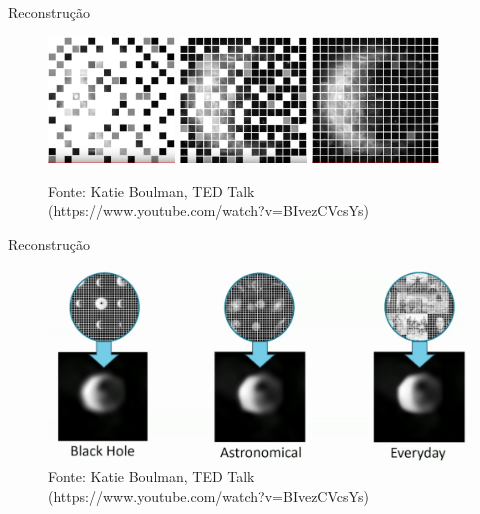 \documentclass{beamer}
\begin{document}
\begin{frame}{Reconstru\c{c}\~ao}
    \begin{figure}
        \includegraphics[width=0.3\textwidth]{figs/reconstrucao2.png}\hfill{}
        \includegraphics[width=0.3\textwidth]{figs/reconstrucao3.png}\hfill{}
        \includegraphics[width=0.3\textwidth]{figs/reconstrucao4.png}
        \caption{Fonte: Katie Boulman, TED
        Talk (https://www.youtube.com/watch?v=BIvezCVcsYs)}
    \end{figure}
\end{frame}

\begin{frame}{Reconstru\c{c}\~ao}
    \begin{figure}
        \includegraphics[width=\textwidth]{figs/reconstrucao5.png}\hfill{}
        \caption{Fonte: Katie Boulman, TED
        Talk (https://www.youtube.com/watch?v=BIvezCVcsYs)}
    \end{figure}
\end{frame}
\end{document}
